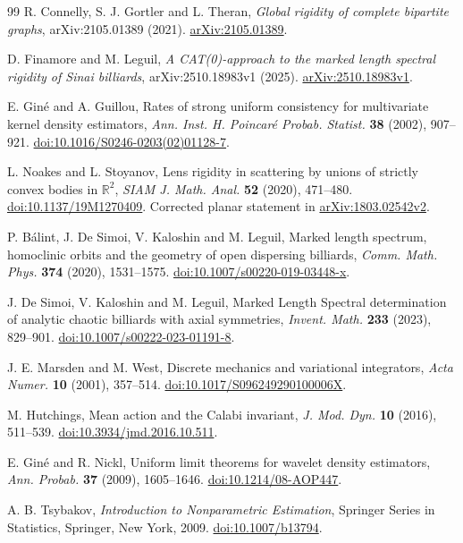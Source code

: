 \begin{thebibliography}{99}
R. Connelly, S. J. Gortler and L. Theran,
\emph{Global rigidity of complete bipartite graphs},
arXiv:2105.01389 (2021).
\href{https://arxiv.org/abs/2105.01389}{arXiv:2105.01389}.

D. Finamore and M. Leguil,
\emph{A CAT(0)-approach to the marked length spectral rigidity of Sinai billiards},
arXiv:2510.18983v1 (2025).
\href{https://arxiv.org/abs/2510.18983v1}{arXiv:2510.18983v1}.

E. Gin\'e and A. Guillou,
Rates of strong uniform consistency for multivariate kernel density
estimators, \emph{Ann. Inst. H. Poincar\'e Probab. Statist.}
\textbf{38} (2002), 907--921.
\href{https://doi.org/10.1016/S0246-0203(02)01128-7}{doi:10.1016/S0246-0203(02)01128-7}.

L. Noakes and L. Stoyanov,
Lens rigidity in scattering by unions of strictly convex bodies in
$\mathbb R^2$, \emph{SIAM J. Math. Anal.} \textbf{52} (2020), 471--480.
\href{https://doi.org/10.1137/19M1270409}{doi:10.1137/19M1270409}.
Corrected planar statement in
\href{https://arxiv.org/abs/1803.02542v2}{arXiv:1803.02542v2}.

P. B\'alint, J. De Simoi, V. Kaloshin and M. Leguil,
Marked length spectrum, homoclinic orbits and the geometry of open
 dispersing billiards, \emph{Comm. Math. Phys.} \textbf{374} (2020),
1531--1575.
\href{https://doi.org/10.1007/s00220-019-03448-x}{doi:10.1007/s00220-019-03448-x}.

J. De Simoi, V. Kaloshin and M. Leguil,
Marked Length Spectral determination of analytic chaotic billiards
with axial symmetries, \emph{Invent. Math.} \textbf{233} (2023), 829--901.
\href{https://doi.org/10.1007/s00222-023-01191-8}{doi:10.1007/s00222-023-01191-8}.

J. E. Marsden and M. West,
Discrete mechanics and variational integrators,
\emph{Acta Numer.} \textbf{10} (2001), 357--514.
\href{https://doi.org/10.1017/S096249290100006X}{doi:10.1017/S096249290100006X}.

M. Hutchings, Mean action and the Calabi invariant,
\emph{J. Mod. Dyn.} \textbf{10} (2016), 511--539.
\href{https://doi.org/10.3934/jmd.2016.10.511}{doi:10.3934/jmd.2016.10.511}.

E. Gin\'e and R. Nickl, Uniform limit theorems for wavelet density
estimators, \emph{Ann. Probab.} \textbf{37} (2009), 1605--1646.
\href{https://doi.org/10.1214/08-AOP447}{doi:10.1214/08-AOP447}.

A. B. Tsybakov, \emph{Introduction to Nonparametric Estimation},
Springer Series in Statistics, Springer, New York, 2009.
\href{https://doi.org/10.1007/b13794}{doi:10.1007/b13794}.
\end{thebibliography}

